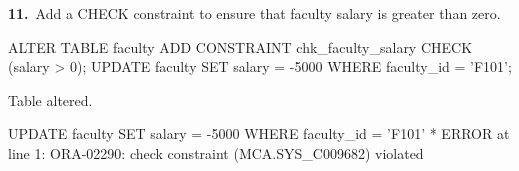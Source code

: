 
\noindent\begin{minipage}{\linewidth}
\begingroup{}
{\fontsize{14}{17}\selectfont\textbf{11.}}\ Add a CHECK constraint to ensure that faculty salary is greater than zero.\par
\endgroup\vspace{12pt}


\begin{sqlcode}
ALTER TABLE faculty ADD CONSTRAINT chk_faculty_salary CHECK (salary > 0);
UPDATE faculty SET salary = -5000 WHERE faculty_id = 'F101';
\end{sqlcode}

\vspace{18pt}


\begin{sqlout}
Table altered.

UPDATE faculty SET salary = -5000 WHERE faculty_id = 'F101'
*
ERROR at line 1:
ORA-02290: check constraint (MCA.SYS_C009682) violated
\end{sqlout}
\end{minipage}\par\vspace{30pt}

